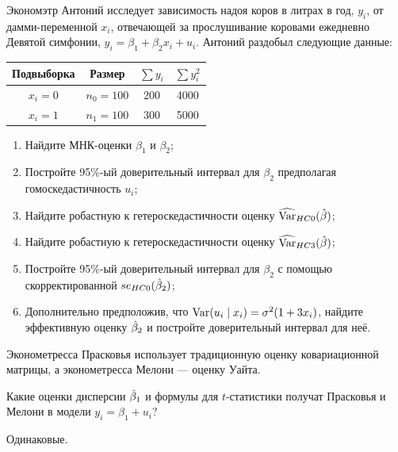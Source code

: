 \begin{problem}
  Экономэтр Антоний исследует зависимость надоя коров в литрах в год, $y_i$, от дамми-переменной $x_i$, отвечающей за прослушивание коровами ежедневно Девятой симфонии, $y_i = \beta_1 + \beta_2 x_i + u_i$. Антоний раздобыл следующие данные:

  \begin{tabular}{cccc}
    \toprule
    Подвыборка & Размер & $\sum y_i$ & $\sum y_i^2$ \\
    \midrule
    $x_i = 0$ & $n_0 = 100$ & 200 & 4000 \\
    $x_i = 1$ & $n_1 = 100$ & 300 & 5000 \\
\bottomrule
  \end{tabular}

  \begin{enumerate}
 \item Найдите МНК-оценки $\beta_1$ и $\beta_2$;
 \item Постройте 95\%-ый доверительный интервал для $\beta_2$ предполагая гомоскедастичность $u_i$;
 \item Найдите робастную к гетероскедастичности оценку $\operatorname{\widehat{\operatorname{Var}}}_{HC0}(\hat{\beta})$;
 \item Найдите робастную к гетероскедастичности оценку $\operatorname{\widehat{\operatorname{Var}}}_{HC3}(\hat{\beta})$;
 \item Постройте 95\%-ый доверительный интервал для $\beta_2$ с помощью скорректированной $se_{HC0}(\hat{\beta}_2)$;
 \item Дополнительно предположив, что $\operatorname{Var}(u_i \mid x_i) = \sigma^2(1+3x_i)$, найдите эффективную оценку $\hat{\beta}_2$ и постройте доверительный интервал для неё.
   \end{enumerate}
  \begin{sol}

  \end{sol}
\end{problem}



\begin{problem}
Эконометресса Прасковья использует традиционную оценку ковариационной матрицы, а эконометресса Мелони — оценку Уайта.

Какие оценки дисперсии $\hat{\beta}_1$ и формулы для $t$-статистики получат Прасковья и Мелони в модели $y_i = \beta_1 + u_i$?
\begin{sol}
Одинаковые.
\end{sol}
\end{problem}

